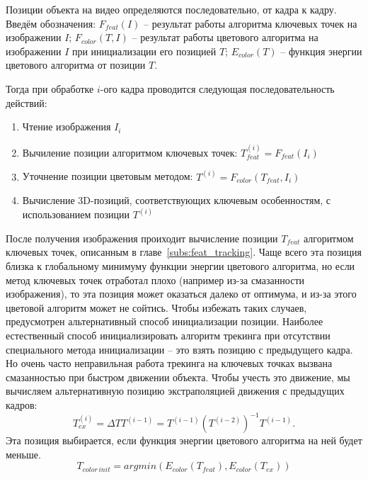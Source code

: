 Позиции объекта на видео определяются последовательно, от кадра к кадру. Введём
обозначения:
$F_{feat}(I)$ -- результат работы алгоритма ключевых точек на изображении $I$;
$F_{color}(T, I)$ -- результат работы цветового алгоритма на изображении $I$
при инициализации его позицией $T$;
$E_{color}(T)$ -- функция энергии цветового алгоритма от позиции $T$.

Тогда при обработке $i$-ого кадра проводится следующая последовательность
действий:
\begin{enumerate} \item Чтение изображения $I_i$ \item Вычиление позиции
алгоритмом ключевых точек: $T_{feat}^{(i)} = F_{feat}(I_i)$ \item Уточнение
позиции цветовым методом: $T^{(i)} = F_{color}(T_{feat}, I_i)$ \item Вычисление
3D-позиций, соответствующих ключевым особенностям, с использованием позиции
$T^{(i)}$ \end{enumerate}
После получения изображения проиходит вычисление позиции $T_{feat}$ алгоритмом
ключевых точек, описанным в главе~\ref{subs:feat_tracking}. Чаще всего эта
позиция близка к глобальному минимуму функции энергии цветового алгоритма, но
если метод ключевых точек отработал плохо (например из-за смазанности
изображения), то эта позиция может оказаться далеко от оптимума, и из-за этого
цветовой алгоритм может не сойтись. Чтобы избежать таких случаев, предусмотрен
альтернативный способ инициализации позиции.
Наиболее естественный способ инициализировать алгоритм трекинга при отсутствии
специального метода инициализации -- это взять позицию с предыдущего кадра. Но
очень часто неправильная работа трекинга на ключевых точках вызвана
смазанностью при быстром движении объекта. Чтобы учесть это движение, мы
вычисляем альтернативную позицию экстраполяцией движения с предыдущих кадров:
\begin{equation} \label{eqn:extrapolation} T^{(i)}_{ex} = \Delta T T^{(i - 1)}
= T^{(i - 1)}(T^{(i - 2)})^{-1} T^{(i - 1)} \text{.} \end{equation}
Эта позиция выбирается, если функция энергии цветового алгоритма на ней будет
меньше.
\begin{equation} \label{eqn:init_selection} T_{color \, init} =
argmin(E_{color}(T_{feat}), E_{color}(T_{ex})) \end{equation}
